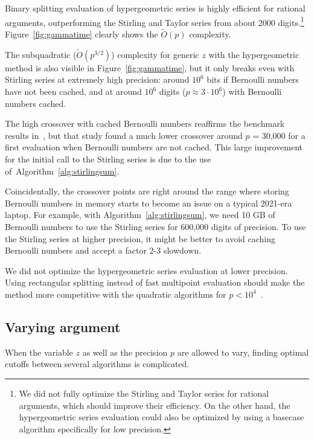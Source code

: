 \documentclass[reqno]{amsart}
\newcommand{\bigOtilde}{\widetilde O}
\theoremstyle{definition}
\begin{document}
Binary splitting evaluation of hypergeometric series
is highly efficient for rational arguments,
outperforming the Stirling and Taylor series from about 2000 digits.\footnote{We did not fully optimize the Stirling and
Taylor series for rational arguments, which should improve their efficiency. On the other hand, the hypergeometric series
evaluation could also be optimized by using a basecase algorithm specifically for low precision.}
Figure~\ref{fig:gammatime} clearly shows the $\bigOtilde(p)$ complexity.

The subquadratic ($\bigOtilde(p^{3/2})$) complexity for generic $z$
with the hypergeometric method
is also visible in Figure~\ref{fig:gammatime},
but it only breaks even with Stirling series at extremely
high precision: around $10^6$ bits if Bernoulli numbers have not been
cached, and at around $10^6$ digits ($p \approx 3 \cdot 10^6$) with Bernoulli numbers cached.

The high crossover with cached Bernoulli numbers reaffirms the
benchmark results in~\cite{Johansson2014rectangular},
but that study found a much lower crossover around $p$ = 30,000
for a first evaluation when Bernoulli numbers are not cached. This large
improvement for the initial call
to the Stirling series is due to the use of~Algorithm~\ref{alg:stirlingsum}.

Coincidentally, the crossover points are right around the range where
storing Bernoulli numbers in memory
starts to become an issue on a typical 2021-era laptop.
For example, with Algorithm~\ref{alg:stirlingsum},
we need 10 GB of Bernoulli numbers to use the
Stirling series for 600,000 digits of precision.
To use the Stirling series at higher precision,
it might be better to avoid caching Bernoulli
numbers and accept a factor 2-3 slowdown.

We did not optimize the hypergeometric series
evaluation at lower precision.
Using rectangular splitting instead of fast multipoint evaluation
should make the method more competitive with the quadratic
algorithms for $p < 10^4$~\cite{Johansson2014rectangular}.

\subsection{Varying argument}

When the variable $z$ as well as the precision $p$ are allowed
to vary, finding optimal cutoffs between several
algorithms is complicated.
\end{document}
